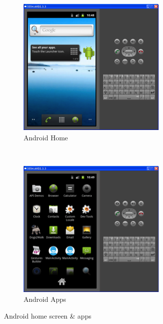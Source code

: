 \begin{figure}[H]%
\centering
    \begin{subfigure}[b]{0.45\textwidth}
        \includegraphics[width=\textwidth]{images/android_home}
        \caption{Android Home}
        \label{fig:android-home}
    \end{subfigure}
    ~ 
    \begin{subfigure}[b]{0.45\textwidth}
        \includegraphics[width=\textwidth]{images/android_apps}
        \caption{Android Apps}
        \label{fig:android-apps}
    \end{subfigure}
\caption{Android home screen \& apps}
\label{fig:android-home-apps}
\end{figure}

